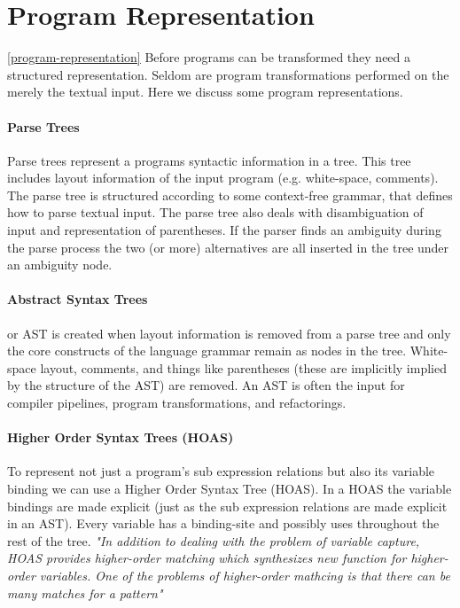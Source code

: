 \section{Program Representation} \ref{program-representation}
Before programs can be transformed they need a structured representation. Seldom are program transformations performed on the merely the textual input. Here we discuss some program representations.

\paragraph{Parse Trees} 
Parse trees represent a programs syntactic information in a tree. This tree includes layout information of the input program (e.g. white-space, comments). The parse tree is structured according to some context-free grammar, that defines how to parse textual input. The parse tree also deals with disambiguation of input and representation of parentheses. If the parser finds an ambiguity during the parse process the two (or more) alternatives are all inserted in the tree under an ambiguity node.

\paragraph{Abstract Syntax Trees}
or AST is created when layout information is removed from a parse tree and only the core constructs of the language grammar remain as nodes in the tree. White-space layout, comments, and things like parentheses (these are implicitly implied by the structure of the AST) are removed. An AST is often the input for compiler pipelines, program transformations, and refactorings.

\paragraph{Higher Order Syntax Trees (HOAS)}
To represent not just a program's sub expression relations but also its variable binding we can use a Higher Order Syntax Tree (HOAS)\cite{Pfenning}. In a HOAS the variable bindings are made explicit (just as the sub expression relations are made explicit in an AST). Every variable has a binding-site and possibly uses throughout the rest of the tree. \textit{"In addition to dealing with the problem of variable capture, HOAS provides higher-order matching which synthesizes new function for higher-order  variables. One of the problems of higher-order mathcing is that there can be many matches for a pattern"}\cite{Visser2001}

